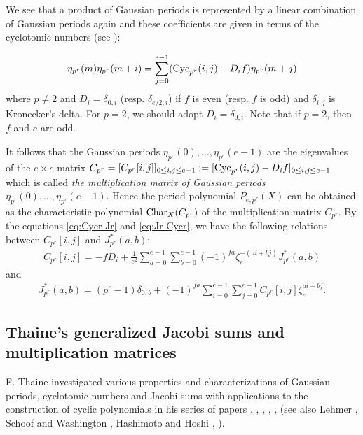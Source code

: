 \documentclass[a4paper, 11pt]{amsart}
\theoremstyle{plain}
\theoremstyle{definition}
\numberwithin{equation}{section}
\begin{document}
We see that a product of Gaussian periods is represented 
by a linear combination of Gaussian periods again 
and these coefficients are given in terms of the cyclotomic numbers 
(see \cite[page 328, Lemma~10.10.2,  page 437, Exercise 12.23]{BEW98}):

\begin{align*}
\eta_{p^r}(m)\eta_{p^r}(m+i)=\sum^{e-1}_{j=0} ({\rm Cyc}_{p^r}(i,j) -D_if)\eta_{p^r}(m+j)
\end{align*}
where $p\neq 2$ and $D_i=\delta_{0,i}$ (resp. $\delta_{e/2 ,i}$) if $f$ is even
(resp. $f$ is odd) and $\delta_{i,j}$ is Kronecker's delta.
For $p=2$, we should adopt $D_i=\delta_{0,i}$.
Note that if $p=2$, then $f$ and $e$ are odd.

It follows that the Gaussian periods $\eta_{p^r}(0),\ldots,\eta_{p^r}(e-1)$ 
are the eigenvalues of the $e \times e$ matrix 
$C_{p^r} = [C_{p^r}[i,j]]_{0\leq i,j\leq e-1} 
:= [{\rm Cyc}_{p^r}(i,j) - D_if]_{0\leq i,j\leq e-1}$ 
which is 
called {\it the multiplication matrix of Gaussian periods 
$\eta_{p^r}(0),\ldots,\eta_{p^r}(e-1)$}. 
Hence the period polynomial $P_{e,p^r}(X)$ can be obtained 
as the characteristic polynomial ${\rm Char}_X(C_{p^r})$ of 
the multiplication matrix $C_{p^r}$. 
By the equations \eqref{eq:Cycr-Jr} and \eqref{eq:Jr-Cycr}, 
we have the following 
relations between $C_{p^r}[i,j]$ 
and  $J_{p^r}^{\ast}(a,b)$: 
\begin{align*}
C_{p^r}[i,j] = -fD_i + \frac{1}{e^2}\sum_{a=0}^{e-1} \sum_{b=0}^{e-1} (-1)^{fa} \zeta_e^{-(ai+bj)}J_{p^r}^{\ast}(a,b)
\end{align*}
and
\begin{align*}
J_{p^r}^{\ast}(a,b)= (p^r-1)\delta_{0,b} + (-1)^{fa}\sum_{i=0}^{e-1} \sum_{j=0}^{e-1} C_{p^r}[i,j] \zeta_e^{ai+bj}. 
\end{align*}

\subsection{Thaine's generalized Jacobi sums and multiplication matrices}

F. Thaine investigated various properties and characterizations of 
Gaussian periods, cyclotomic numbers and Jacobi sums 
with applications to the construction of cyclic polynomials 
in his series of papers \cite{Tha96}, \cite{Tha99}, 
\cite{Tha00}, \cite{Tha01}, \cite{Tha04}, \cite{Tha08} 
(see also Lehmer \cite{Leh88}, 
Schoof and Washington \cite{SW88}, 
Hashimoto and Hoshi \cite{HH05a}, \cite{HH05b}). 
\end{document}

